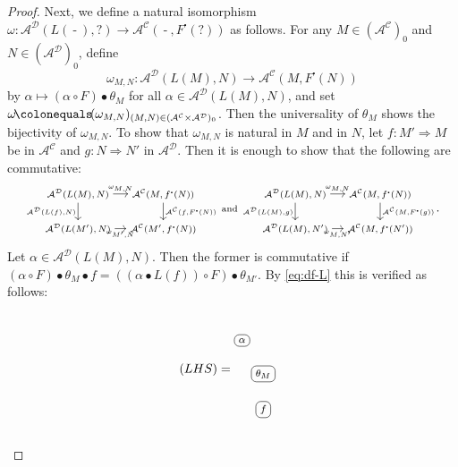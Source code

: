 \documentclass{surv-l}
\numberwithin{equation}{chapter}
\numberwithin{figure}{chapter}
\theoremstyle{plain}
\theoremstyle{definition}
\theoremstyle{remark}
\newcommand{\Ar}[3]{\ar[from={#1}, to={#2}, #3]}
\newcommand{\RN}{\node[rounded corners, draw]}
\DeclareMathOperator{\blank}{-}
\begin{document}
\begin{proof}
Next, we define a natural isomorphism $\omega \colon \mathcal{A}^{{\mathcal{D}}}(L(\blank), ?) \to \mathcal{A}^{{\mathcal{C}}}(\blank, F^{\centerdot}(?))$
as follows.
For any $M \in (\mathcal{A}^{{\mathcal{C}}})_0$ and $N \in (\mathcal{A}^{{\mathcal{D}}})_0$, define
\[
\omega_{M,N} \colon \mathcal{A}^{{\mathcal{D}}}(L(M), N) \to \mathcal{A}^{{\mathcal{C}}}(M, F^{\centerdot}(N))
\]
by $\alpha \mapsto (\alpha \circ F) \bullet \theta_M$ for all $\alpha \in \mathcal{A}^{{\mathcal{D}}}(L(M), N)$,
and set $\omega\!\colonequals\!  (\omega_{M,N})_{(M,N) \in (\mathcal{A}^{{\mathcal{C}}} \times \mathcal{A}^{{\mathcal{D}}})_0}$.
Then the universality of $\theta_M$ shows the bijectivity of $\omega_{M,N}$.
To show that $\omega_{M,N}$ is natural in $M$ and in $N$,
let $f \colon M' \Rightarrow M$ be in $\mathcal{A}^{{\mathcal{C}}}$ and $g \colon N \Rightarrow N'$ in $\mathcal{A}^{{\mathcal{D}}}$.
Then it is enough to show that the following are commutative:
\[\scriptsize
\begin{tikzcd}[column sep=small]
\mathcal{A}^{{\mathcal{D}}}(L(M), N) & \mathcal{A}^{{\mathcal{C}}}(M, f^{\centerdot}(N))\\
\mathcal{A}^{{\mathcal{D}}}(L(M'), N) & \mathcal{A}^{{\mathcal{C}}}(M', f^{\centerdot}(N))
\Ar{1-1}{1-2}{"{\omega_{M,N}}"}
\Ar{2-1}{2-2}{"{\omega_{M',N}}"'}
\Ar{1-1}{2-1}{"{\mathcal{A}^{{\mathcal{D}}}(L(f), N)}"'}
\Ar{1-2}{2-2}{"{\mathcal{A}^{{\mathcal{C}}}(f, F^{\centerdot}(N))}"}
\end{tikzcd}
\text{ and }
\begin{tikzcd}[column sep=small]
\mathcal{A}^{{\mathcal{D}}}(L(M), N) & \mathcal{A}^{{\mathcal{C}}}(M, f^{\centerdot}(N))\\
\mathcal{A}^{{\mathcal{D}}}(L(M), N') & \mathcal{A}^{{\mathcal{C}}}(M, f^{\centerdot}(N'))
\Ar{1-1}{1-2}{"{\omega_{M,N}}"}
\Ar{2-1}{2-2}{"{\omega_{M,N'}}"'}
\Ar{1-1}{2-1}{"{\mathcal{A}^{{\mathcal{D}}}(L(M), g)}"'}
\Ar{1-2}{2-2}{"{\mathcal{A}^{{\mathcal{C}}}(M, F^{\centerdot}(g))}"}
\end{tikzcd}.
\]
Let $\alpha \in \mathcal{A}^{{\mathcal{D}}}(L(M), N)$.
Then the former is commutative if
$(\alpha \circ F)\bullet \theta_M \bullet f = ((\alpha \bullet L(f))\circ F) \bullet \theta_{M'}$.
By \eqref{eq:df-L} this is verified as follows:
\[\footnotesize
(LHS) =
\begin{tikzcd}[column sep=0.1em]
{}&&{}\\
\RN(ta) {\alpha};&&\\
&\RN(th) {\theta_{M}};&\\
&\RN(et) {f};&\\

\end{tikzcd}\]
\end{proof}
\end{document}
